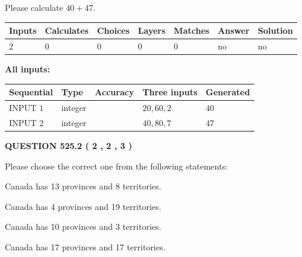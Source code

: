 \documentclass[12pt]{article}
\begin{document}
  
 
Please calculate $ %
40 +  %
47 $.
 
 
   
   
   
   
\noindent\begin{tabular}{|l|l|l|l|l|l|l|}
 \hline
Inputs & Calculates & Choices & Layers & Matches & Answer & Solution \\ \hline
 2  & 
 0  & 
 0
  & 
 0  & 
 0  & 
  no & 
  no 
  \\ \hline
 \end{tabular}
   
   
   
   
\noindent{}
   
   
   
   
\noindent\vspace{0.1in}\hspace{-0.08in} {\textbf{\Large{All inputs: }}}
   
   
  
  
\noindent\begin{tabular}{|l|l|l|l|l|}
\hline
 Sequential & Type & Accuracy & Three inputs & Generated \\ 
\hline
 
 
  INPUT $  1 $ & integer &  & $
 20
 , 
 60
 , 
 2
 $ & $ 40 $ 
 \\  \hline  
 
 
  INPUT $  2 $ & integer &  & $
 40
 , 
 80
 , 
 7
 $ & $ 47 $ 
 \\  \hline  
 \end{tabular}
   
   
  
\vspace{0.2in}
  
{\textbf{\Large{QUESTION
525.2 
 ( 2 , 2 , 3 )
}}}
  
  
Please choose the correct one from the following statements:
 
 
Canada has  13 provinces and  8 territories.
 
 
Canada has   4 provinces and  19 territories.
 
 
Canada has 10  provinces and 3 territories.
 
 
Canada has  17 provinces and  17 territories.
 
\end{document}
